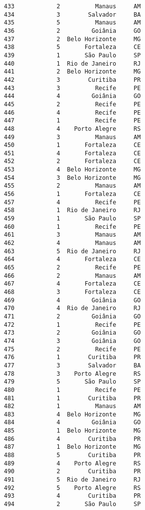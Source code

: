 \documentclass[11pt]{article}
\begin{document}
\begin{Verbatim}[commandchars=\\\{\}]
433            2          Manaus     AM  
434            3        Salvador     BA  
435            5          Manaus     AM  
436            2         Goiânia     GO  
437            2  Belo Horizonte     MG  
438            5       Fortaleza     CE  
439            1       São Paulo     SP  
440            1  Rio de Janeiro     RJ  
441            2  Belo Horizonte     MG  
442            3        Curitiba     PR  
443            3          Recife     PE  
444            4         Goiânia     GO  
445            2          Recife     PE  
446            4          Recife     PE  
447            1          Recife     PE  
448            4    Porto Alegre     RS  
449            3          Manaus     AM  
450            1       Fortaleza     CE  
451            4       Fortaleza     CE  
452            2       Fortaleza     CE  
453            4  Belo Horizonte     MG  
454            3  Belo Horizonte     MG  
455            2          Manaus     AM  
456            1       Fortaleza     CE  
457            4          Recife     PE  
458            1  Rio de Janeiro     RJ  
459            1       São Paulo     SP  
460            1          Recife     PE  
461            3          Manaus     AM  
462            4          Manaus     AM  
463            5  Rio de Janeiro     RJ  
464            4       Fortaleza     CE  
465            2          Recife     PE  
466            2          Manaus     AM  
467            4       Fortaleza     CE  
468            3       Fortaleza     CE  
469            4         Goiânia     GO  
470            4  Rio de Janeiro     RJ  
471            2         Goiânia     GO  
472            1          Recife     PE  
473            2         Goiânia     GO  
474            3         Goiânia     GO  
475            2          Recife     PE  
476            1        Curitiba     PR  
477            3        Salvador     BA  
478            3    Porto Alegre     RS  
479            5       São Paulo     SP  
480            1          Recife     PE  
481            1        Curitiba     PR  
482            1          Manaus     AM  
483            4  Belo Horizonte     MG  
484            4         Goiânia     GO  
485            1  Belo Horizonte     MG  
486            4        Curitiba     PR  
487            1  Belo Horizonte     MG  
488            5        Curitiba     PR  
489            4    Porto Alegre     RS  
490            2        Curitiba     PR  
491            5  Rio de Janeiro     RJ  
492            5    Porto Alegre     RS  
493            4        Curitiba     PR  
494            2       São Paulo     SP  

\end{Verbatim}
\end{document}

